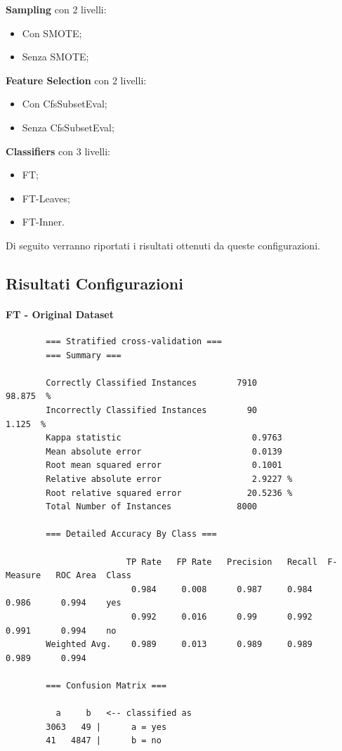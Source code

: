 \textbf{Sampling} con 2 livelli:
\begin{itemize}
	\item Con SMOTE;
	\item Senza SMOTE;
\end{itemize}
\textbf{Feature Selection} con 2 livelli:
\begin{itemize}
	\item Con CfsSubsetEval;
	\item Senza CfsSubsetEval;
\end{itemize}
\textbf{Classifiers} con 3 livelli:
\begin{itemize}
	\item FT;
	\item FT-Leaves;
	\item FT-Inner.
\end{itemize}
Di seguito verranno riportati i risultati ottenuti da queste configurazioni. 
\subsection{Risultati Configurazioni}
\paragraph{FT - Original Dataset}
{\footnotesize
	\begin{verbatim}
		=== Stratified cross-validation ===
		=== Summary ===
		
		Correctly Classified Instances        7910               98.875  %
		Incorrectly Classified Instances        90                1.125  %
		Kappa statistic                          0.9763
		Mean absolute error                      0.0139
		Root mean squared error                  0.1001
		Relative absolute error                  2.9227 %
		Root relative squared error             20.5236 %
		Total Number of Instances             8000     
		
		=== Detailed Accuracy By Class ===
		
		                TP Rate   FP Rate   Precision   Recall  F-Measure   ROC Area  Class
		                 0.984     0.008      0.987     0.984     0.986      0.994    yes
		                 0.992     0.016      0.99      0.992     0.991      0.994    no
		Weighted Avg.    0.989     0.013      0.989     0.989     0.989      0.994
		
		=== Confusion Matrix ===
		
		  a     b   <-- classified as
		3063   49 |      a = yes
		41   4847 |      b = no
	\end{verbatim}
}

